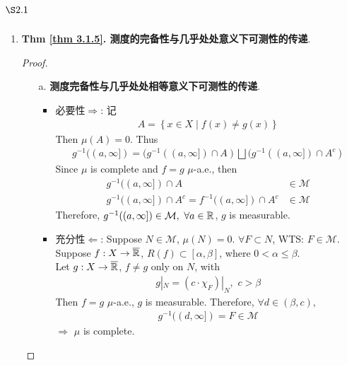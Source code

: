 \section{$\S 2.1$}
	\begin{enumerate}
		\item \textbf{Thm \ref{thm 3.1.5}. 测度的完备性与几乎处处意义下可测性的传递}. \\
		\begin{proof}
			\begin{enumerate}
				\item [a.] \textbf{测度完备性与几乎处处相等意义下可测性的传递}. \\
				\begin{itemize}
					\item 必要性$\Rightarrow$: 记
					\begin{align}
						A = \left\{ x \in X \mid f(x) \neq g(x) \right\}
					\end{align}
					Then $\mu(A) = 0$. Thus
					\begin{align}
						g^{-1}((a , \infty]) = (g^{-1}((a , \infty]) \cap A) \bigsqcup (g^{-1}((a , \infty]) \cap A^c)
					\end{align}
					Since $\mu$ is complete and $f = g \,\, \mu$-a.e., then
					\begin{align}
						g^{-1}((a , \infty]) \cap A &\in \mathcal{M} \\
						g^{-1}((a , \infty]) \cap A^c = f^{-1}((a , \infty]) \cap A^c &\in \mathcal{M}
					\end{align}
					Therefore, $g^{-1}((a , \infty]) \in \mathcal{M} , \,\, \forall a \in \mathbb{R}$, $g$ is measurable.
					
					\vspace*{6em}
					
					\item 充分性$\Leftarrow$: Suppose $N \in \mathcal{M}$, $\mu(N) = 0$. $\forall F \subset N$, WTS: $F \in \mathcal{M}$. \\
					Suppose $f : X \rightarrow \overline{\mathbb{R}}$, $R(f) \subset [\alpha , \beta]$, where $0 < \alpha \leq \beta$. \\
					Let $g : X \rightarrow \overline{\mathbb{R}}$, $f \neq g$ only on $N$, with
					\begin{align}
						g|_{N} = (c \cdot \chi_{F})|_{N} , \,\, c > \beta
					\end{align}
					Then $f = g \,\, \mu$-a.e., $g$ is measurable. Therefore, $\forall d \in (\beta , c)$,
					\begin{align}
						g^{-1}((d , \infty]) = F \in \mathcal{M}
					\end{align}
					$\Rightarrow \,\, \mu$ is complete.
				\end{itemize}
				

\end{enumerate}
\end{proof}
\end{enumerate}
